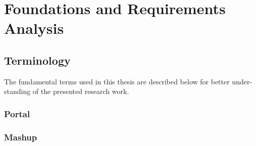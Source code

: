 \chapter{Foundations and Requirements Analysis}

\section{Terminology}
The fundamental terms used in this thesis are described below for better under-
standing of the presented research work.
\subsection {Portal}
\subsection {Mashup}

